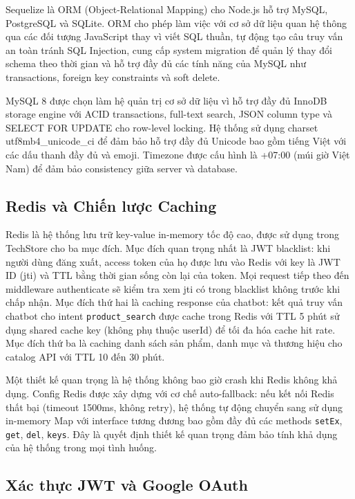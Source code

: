 Sequelize là ORM (Object-Relational Mapping) cho Node.js hỗ trợ MySQL, PostgreSQL và SQLite. ORM cho phép làm việc với cơ sở dữ liệu quan hệ thông qua các đối tượng JavaScript thay vì viết SQL thuần, tự động tạo câu truy vấn an toàn tránh SQL Injection, cung cấp system migration để quản lý thay đổi schema theo thời gian và hỗ trợ đầy đủ các tính năng của MySQL như transactions, foreign key constraints và soft delete.

MySQL 8 được chọn làm hệ quản trị cơ sở dữ liệu vì hỗ trợ đầy đủ InnoDB storage engine với ACID transactions, full-text search, JSON column type và SELECT FOR UPDATE cho row-level locking. Hệ thống sử dụng charset utf8mb4\_unicode\_ci để đảm bảo hỗ trợ đầy đủ Unicode bao gồm tiếng Việt với các dấu thanh đầy đủ và emoji. Timezone được cấu hình là +07:00 (múi giờ Việt Nam) để đảm bảo consistency giữa server và database.

\subsection{Redis và Chiến lược Caching}

Redis là hệ thống lưu trữ key-value in-memory tốc độ cao, được sử dụng trong TechStore cho ba mục đích. Mục đích quan trọng nhất là JWT blacklist: khi người dùng đăng xuất, access token của họ được lưu vào Redis với key là JWT ID (jti) và TTL bằng thời gian sống còn lại của token. Mọi request tiếp theo đến middleware authenticate sẽ kiểm tra xem jti có trong blacklist không trước khi chấp nhận. Mục đích thứ hai là caching response của chatbot: kết quả truy vấn chatbot cho intent \texttt{product\_search} được cache trong Redis với TTL 5 phút sử dụng shared cache key (không phụ thuộc userId) để tối đa hóa cache hit rate. Mục đích thứ ba là caching danh sách sản phẩm, danh mục và thương hiệu cho catalog API với TTL 10 đến 30 phút.

Một thiết kế quan trọng là hệ thống không bao giờ crash khi Redis không khả dụng. Config Redis được xây dựng với cơ chế auto-fallback: nếu kết nối Redis thất bại (timeout 1500ms, không retry), hệ thống tự động chuyển sang sử dụng in-memory Map với interface tương đương bao gồm đầy đủ các methods \texttt{setEx}, \texttt{get}, \texttt{del}, \texttt{keys}. Đây là quyết định thiết kế quan trọng đảm bảo tính khả dụng của hệ thống trong mọi tình huống.

\subsection{Xác thực JWT và Google OAuth}

